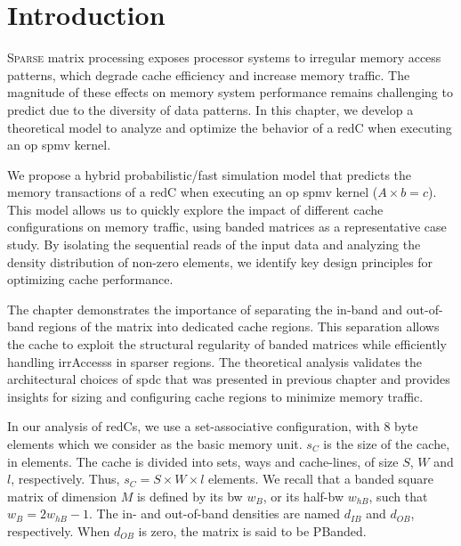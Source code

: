 
\section{Introduction}
\label{sec:theory:intro}

\lettrine{S}{parse} matrix processing exposes processor systems to irregular memory access patterns, which degrade cache efficiency and increase memory traffic.
The magnitude of these effects on memory system performance remains challenging to predict due to the diversity of data patterns.
In this chapter, we develop a theoretical model to analyze and optimize the behavior of a \gls{redC} when executing an \acrfull{op} \acrshort{spmv} kernel.

We propose a hybrid probabilistic/fast simulation model that predicts the memory transactions of a \gls{redC} when executing an \acrshort{op} \acrshort{spmv} kernel \mbox{($A \times b = c$)}.
This model allows us to quickly explore the impact of different cache configurations on memory traffic, using \gls{banded} matrices as a representative case study.
By isolating the sequential reads of the input data and analyzing the density distribution of non-zero elements, we identify key design principles for optimizing cache performance.

The chapter demonstrates the importance of separating the in-\gls{band} and out-of-\gls{band} regions of the matrix into dedicated cache regions.
This separation allows the cache to exploit the structural regularity of \gls{banded} matrices while efficiently handling \glspl{irrAccess} in sparser regions.
The theoretical analysis validates the architectural choices of \acrlong{spdc} that was presented in previous chapter and provides insights for sizing and configuring cache regions to minimize memory traffic.

In our analysis of \glspl{redC}, we use a \gls{set}-associative configuration, with $8$ byte elements which we consider as the basic memory unit.
$s_C$ is the size of the cache, in elements.
The cache is divided into \glspl{set}, \glspl{way} and cache-lines, of size $S$, $W$ and $l$, respectively.
Thus, $s_C = S \times W \times l$ elements.
We recall that a \gls{banded} square matrix of dimension $M$ is defined by its \gls{bw} $w_B$, or its half-\gls{bw} $w_\mathit{hB}$, such that $w_B = 2w_\mathit{hB} - 1$.
The in- and out-of-\gls{band} densities are named $d_\mathit{IB}$ and $d_\mathit{OB}$, respectively.
When $d_\mathit{OB}$ is zero, the matrix is said to be \gls{PBanded}.